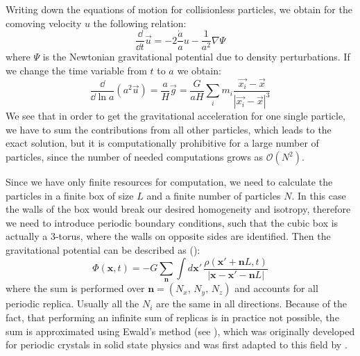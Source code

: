 Writing down the equations of motion for collisionless particles, 
we obtain for the comoving velocity $u$ the following relation:
\begin{equation}
\frac{\dd{}}{\dd{t}}\vec{u}=-2\frac{\dot{a}}{a}u-\frac{1}{a^{2}}\nabla\Psi
\end{equation}
where $\Psi$ is the Newtonian gravitational potential due to density
perturbations. If we change the time variable from $t$ to $a$ we
obtain:
\begin{equation}
\frac{\dd{}}{\dd{\ln a}}(a^{2}\vec{u})=\frac{a}{H}\vec{g}=\frac{G}{aH}\sum_{i}m_{i}\frac{\vec{x_{i}}-\vec{x}}{\left|\vec{x_{i}}-\vec{x}\right|^{3}}
\end{equation}
We see that in order to get the gravitational acceleration for one
single particle, we have to sum the contributions from all other particles,
which leads to the exact solution, but it is computationally prohibitive
for a large number of particles, since the number of needed computations
grows as $\mathcal{O}(N^{2})$. 

Since we have only finite resources for computation, we need to calculate
the particles in a finite box of size $L$ and a finite number of
particles $N$. In this case the walls of the box would break our
desired homogeneity and isotropy, therefore we need to introduce periodic
boundary conditions, such that the cubic box is actually a 3-torus,
where the walls on opposite sides are identified. Then the gravitational
potential can be described as (\citet{dehnen_n-body_2011}): 
\begin{equation}
\Phi(\mathbf{x},t)=-G\sum_{\mathbf{n}}\int d\mathbf{x}'\,\frac{\rho(\mathbf{x}'+\mathbf{n}L,t)}{\left|\mathbf{x-x}'-\mathbf{n}L\right|}
\end{equation}
where the sum is performed over $\mathbf{n}=(N_{x},\,N_{y},\,N_{z})$
and accounts for all periodic replica. Usually all the $N_{i}$ are
the same in all directions. Because of the fact, that performing an
infinite sum of replicas is in practice not possible, the sum is approximated
using Ewald's method (see \cite{ewald_berechnung_1921}), which was
originally developed for periodic crystals in solid state physics
and was first adapted to this field by \cite{hernquist_application_1991}.

